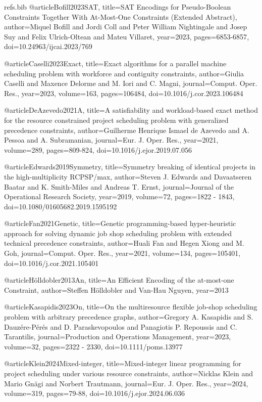 \begin{filecontents}{refs.bib}
@article{Bofill2023SAT,
title={SAT Encodings for Pseudo-Boolean Constraints Together With At-Most-One Constraints (Extended Abstract)},
author={Miquel Bofill and Jordi Coll and Peter William Nightingale and Josep Suy and Felix Ulrich-Oltean and Mateu Villaret},
year={2023},
pages={6853-6857},
doi={10.24963/ijcai.2023/769}
}

@article{Caselli2023Exact,
title={Exact algorithms for a parallel machine scheduling problem with workforce and contiguity constraints},
author={Giulia Caselli and Maxence Delorme and M. Iori and C. Magni},
journal={Comput. Oper. Res.},
year={2023},
volume={163},
pages={106484},
doi={10.1016/j.cor.2023.106484}
}

@article{DeAzevedo2021A,
title={A satisfiability and workload-based exact method for the resource constrained project scheduling problem with generalized precedence constraints},
author={Guilherme Henrique Ismael de Azevedo and A. Pessoa and A. Subramanian},
journal={Eur. J. Oper. Res.},
year={2021},
volume={289},
pages={809-824},
doi={10.1016/j.ejor.2019.07.056}
}

@article{Edwards2019Symmetry,
title={Symmetry breaking of identical projects in the high-multiplicity RCPSP/max},
author={Steven J. Edwards and Davaatseren Baatar and K. Smith‐Miles and Andreas T. Ernst},
journal={Journal of the Operational Research Society},
year={2019},
volume={72},
pages={1822 - 1843},
doi={10.1080/01605682.2019.1595192}
}

@article{Fan2021Genetic,
title={Genetic programming-based hyper-heuristic approach for solving dynamic job shop scheduling problem with extended technical precedence constraints},
author={Huali Fan and Hegen Xiong and M. Goh},
journal={Comput. Oper. Res.},
year={2021},
volume={134},
pages={105401},
doi={10.1016/j.cor.2021.105401}
}

@article{Hölldobler2013An,
title={An Efficient Encoding of the at-most-one Constraint},
author={Steffen Hölldobler and Van-Hau Nguyen},
year={2013}
}

@article{Kasapidis2023On,
title={On the multiresource flexible job‐shop scheduling problem with arbitrary precedence graphs},
author={Gregory A. Kasapidis and S. Dauzére-Pérés and D. Paraskevopoulos and Panagiotis P. Repoussis and C. Tarantilis},
journal={Production and Operations Management},
year={2023},
volume={32},
pages={2322 - 2330},
doi={10.1111/poms.13977}
}

@article{Klein2024Mixed-integer,
title={Mixed-integer linear programming for project scheduling under various resource constraints},
author={Nicklas Klein and Mario Gnägi and Norbert Trautmann},
journal={Eur. J. Oper. Res.},
year={2024},
volume={319},
pages={79-88},
doi={10.1016/j.ejor.2024.06.036}
}


\end{filecontents}
